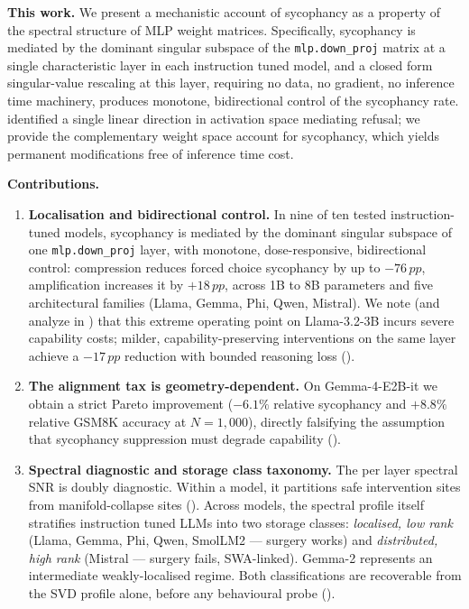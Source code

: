 \documentclass{article}
\newcommand{\pp}{\,pp}
\begin{document}
\textbf{This work.}
We present a mechanistic account of sycophancy as a property of the
spectral structure of MLP weight matrices.
Specifically, sycophancy is mediated by the dominant singular
subspace of the \texttt{mlp.down\_proj} matrix at a single characteristic
layer in each instruction tuned model, and a closed form singular-value
rescaling at this layer, requiring no data, no gradient, no
inference time machinery, produces monotone, bidirectional control of
the sycophancy rate.
\citet{arditiRefusalLanguageModels2024} identified a single linear
direction in activation space mediating refusal; we provide the
complementary weight space account for sycophancy, which yields
permanent modifications free of inference time cost.

\textbf{Contributions.}
\begin{enumerate}[leftmargin=1.4em,itemsep=2pt,topsep=3pt]
\item \textbf{Localisation and bidirectional control.}
 In nine of ten tested instruction-tuned models, sycophancy is
 mediated by the dominant singular subspace of one
 \texttt{mlp.down\_proj} layer, with monotone, dose-responsive,
 bidirectional control: compression reduces forced choice sycophancy
 by up to $-76\pp$, amplification increases it by $+18\pp$, across 1B
 to 8B parameters and five architectural families (Llama, Gemma, Phi, Qwen, Mistral). We note (and
 analyze in ) that this extreme
 operating point on Llama-3.2-3B incurs severe capability costs;
 milder, capability-preserving interventions on the same layer achieve
 a $-17\pp$ reduction with bounded reasoning loss
 ().
\item \textbf{The alignment tax is geometry-dependent.}
 On Gemma-4-E2B-it we obtain a strict Pareto improvement
 ($-6.1\%$ relative sycophancy and $+8.8\%$ relative GSM8K accuracy
 at $N{=}1{,}000$), directly falsifying the assumption that sycophancy
 suppression must degrade capability ().
\item \textbf{Spectral diagnostic and storage class taxonomy.}
 The per layer spectral SNR is doubly diagnostic. Within a model, it
 partitions safe intervention sites from manifold-collapse sites
 (). Across models, the spectral profile
 itself stratifies instruction tuned LLMs into two storage classes:
 \emph{localised, low rank} (Llama, Gemma, Phi, Qwen, SmolLM2 — surgery
 works) and \emph{distributed, high rank} (Mistral — surgery fails,
 SWA-linked). Gemma-2 represents an intermediate weakly-localised regime. Both
 classifications are recoverable from the SVD profile alone, before
 any behavioural probe ().
\end{enumerate}
\end{document}
